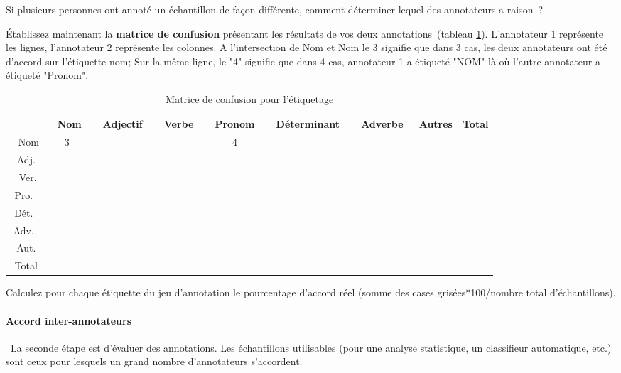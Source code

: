   Si plusieurs personnes ont annoté un échantillon de façon différente, comment déterminer lequel des annotateurs a raison ?

 Établissez maintenant la \textbf{matrice de confusion} présentant les résultats de vos deux annotations (tableau \ref{matrice}). L'annotateur 1 représente les lignes, l'annotateur 2 représente les colonnes. A l'intersection de Nom et Nom le 3 signifie que dans 3 cas, les deux annotateurs ont été d'accord sur l'étiquette nom; Sur la même ligne, le "4" signifie que dans 4 cas, annotateur 1 a étiqueté "NOM" là où l'autre annotateur a étiqueté "Pronom".


\begin{small}
\begin{table}[h]
\begin{tabular}{c|c|c|c|c|c|c|c|c}
 & Nom & Adjectif & Verbe & Pronom & Déterminant & Adverbe & Autres&Total\\
\hline
 Nom &\cellcolor{lightgray}3 &	&	&4	&	&	&&\\
\hline
Adj.&	&\cellcolor{lightgray}	&	&	&	&	&&\\ 
Ver. 	&	&	&\cellcolor{lightgray}	&	&	&	&&\\
\hline
Pro. &	&	&	&\cellcolor{lightgray}	&	&	&\\
\hline
Dét. &	&	&	&	&\cellcolor{lightgray}	&	&\\
\hline
Adv. &	&	&	&	&	&\cellcolor{lightgray}	&\\
\hline
Aut.  &	&	&	&	&	&	&\cellcolor{lightgray}\\
\hline
\hline
Total	&	&	&	&	&	&	&\\
\end{tabular}
\caption{\label{matrice} Matrice de confusion pour l'étiquetage}
\end{table}
\end{small}
Calculez pour chaque étiquette du jeu d'annotation le pourcentage d'accord réel (somme des cases grisées*100/nombre total d'échantillons).

  \paragraph{Accord inter-annotateurs}

 La seconde étape est d'évaluer des annotations. Les échantillons utilisables (pour une analyse statistique, un classifieur automatique, etc.) sont ceux pour lesquels un grand nombre d'annotateurs s'accordent.

